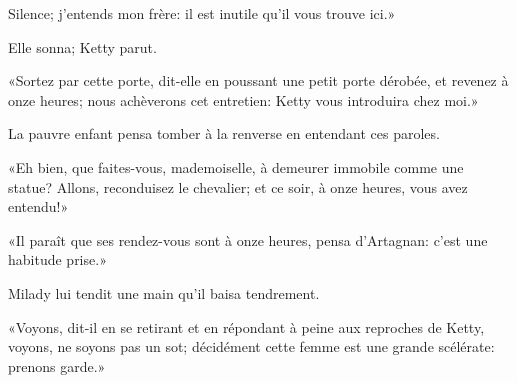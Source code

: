 \speak  Silence; j'entends mon frère: il est inutile qu'il vous trouve ici.» 

Elle sonna; Ketty parut. 

«Sortez par cette porte, dit-elle en poussant une petit porte dérobée, et revenez à onze heures; nous achèverons cet entretien: Ketty vous introduira chez moi.» 

La pauvre enfant pensa tomber à la renverse en entendant ces paroles. 

«Eh bien, que faites-vous, mademoiselle, à demeurer immobile comme une statue? Allons, reconduisez le chevalier; et ce soir, à onze heures, vous avez entendu!» 

«Il paraît que ses rendez-vous sont à onze heures, pensa d'Artagnan: c'est une habitude prise.» 

Milady lui tendit une main qu'il baisa tendrement. 

«Voyons, dit-il en se retirant et en répondant à peine aux reproches de Ketty, voyons, ne soyons pas un sot; décidément cette femme est une grande scélérate: prenons garde.» 